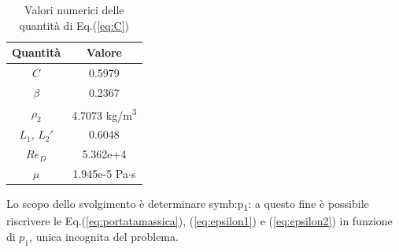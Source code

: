 \begin{table}[H]
	\centering
	\begin{tabular}{c|c}
		\toprule
		\toprule
		\textbf{Quantità} & \textbf{Valore}\\
		\midrule
		\midrule
		$C$ & 0.5979\\
		\midrule
		$\beta$ & 0.2367\\
		\midrule
		$\rho_2$ & 4.7073 kg/m\textsuperscript{3}\\
		\midrule
		$L_1,\,L_2'$ & 0.6048\\
		\midrule
		$Re_D$ & 5.362e+4\\
		\midrule
		$\mu$ & 1.945e-5 Pa$\cdot$s\\
		\bottomrule
		\bottomrule
	\end{tabular}
\caption{Valori numerici delle quantità di Eq.(\ref{eq:C})}
\label{tab:valoriC}
\end{table}

Lo scopo dello svolgimento è determinare \gls{symb:p}\textsubscript{1}: a questo fine è possibile riscrivere le Eq.(\ref{eq:portatamassica}), (\ref{eq:epsilon1}) e (\ref{eq:epsilon2}) in funzione di $p_1$, unica incognita del problema. 